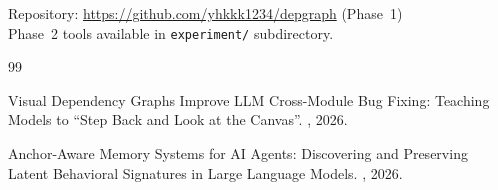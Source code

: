 \documentclass[11pt,a4paper]{article}
\begin{document}
Repository: \url{https://github.com/yhkkk1234/depgraph} (Phase~1) \\
Phase~2 tools available in \texttt{experiment/} subdirectory.


% 
% 

\begin{thebibliography}{99}

Visual Dependency Graphs Improve LLM Cross-Module Bug Fixing: Teaching Models to ``Step Back and Look at the Canvas''.
, 2026.

Anchor-Aware Memory Systems for AI Agents: Discovering and Preserving Latent Behavioral Signatures in Large Language Models.
, 2026.

\end{thebibliography}
\end{document}
